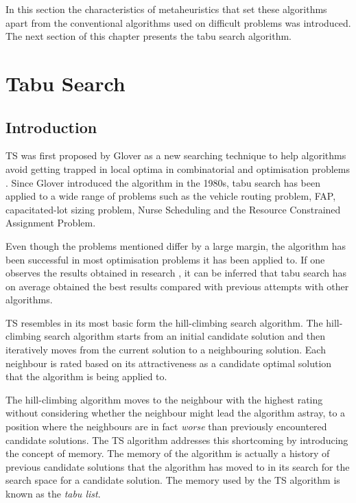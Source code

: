 In this section the characteristics of metaheuristics that set these algorithms apart from the conventional algorithms used on difficult problems was introduced. The next section of this chapter presents the tabu search algorithm.
\section{Tabu Search}
\label{sec:tabusearch}
\subsection{Introduction}
\label{sec:TSIntroduction}
\Gls{TS} was first proposed by Glover\cite{Glover89} as a new searching technique to help algorithms avoid getting trapped in local optima in combinatorial and optimisation problems \cite{TabuRCAProblem}. Since Glover introduced the algorithm in the 1980s, tabu search has been applied to a wide range of problems such as the vehicle routing problem\cite{TabuVechicleRoutingWithTimeWindows}, \gls{FAP}\cite{TabuMontemanniSmith}, capacitated-lot sizing problem\cite{TabuCarryOver}, Nurse Scheduling\cite{TabuNurse} and the Resource Constrained Assignment Problem\cite{TabuRCAProblem}. 

Even though the problems mentioned differ by a large margin, the algorithm has been successful in most optimisation problems it has been applied to. If one observes the results obtained in research \cite{TabuMontemanniSmith,tabuglobalplanning3g}, it can be inferred that tabu search has on average obtained the best results compared with previous attempts with other algorithms. 

\Gls{TS} resembles in its most basic form the hill-climbing search algorithm\cite{TabuBiddingStrats}. The hill-climbing search algorithm starts from an initial candidate solution and then iteratively moves from the current solution to a neighbouring solution\cite{AIModernApproach}. Each neighbour is rated based on its attractiveness as a candidate optimal solution that the algorithm is being applied to\cite{AIModernApproach}. 

The hill-climbing algorithm moves to the neighbour with the highest rating without considering whether the neighbour might lead the algorithm astray, to a position where the neighbours are in fact \emph{worse} than previously encountered candidate solutions\cite{AIModernApproach}. 
The \gls{TS} algorithm addresses this shortcoming by introducing the concept of memory\cite{TabuBiddingStrats}. The memory of the algorithm is actually a history of previous candidate solutions that the algorithm has moved to in its search for the search space for a candidate solution\cite{TabuBiddingStrats}. The memory used by the \gls{TS} algorithm is known as the \emph{tabu list}.

